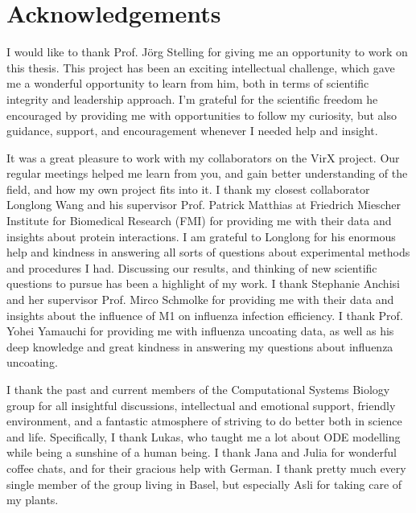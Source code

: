 
\bigskip

\begingroup
\let\clearpage\relax
\let\cleardoublepage\relax
\let\cleardoublepage\relax
\chapter*{Acknowledgements}

\def\thanks#1{%
\begingroup
\leftskip1em
\noindent #1
\par
\endgroup
}

I would like to thank Prof. J\"org Stelling for giving me an opportunity to work on this thesis. This project has been an exciting intellectual challenge, which gave me a wonderful opportunity to learn from him, both in terms of scientific integrity and leadership approach. I'm grateful for the scientific freedom he encouraged by providing me with opportunities to follow my curiosity, but also guidance, support, and encouragement whenever I needed help and insight.

It was a great pleasure to work with my collaborators on the VirX project. Our regular meetings helped me learn from you, and gain better understanding of the field, and how my own project fits into it. I thank my closest collaborator Longlong Wang and his supervisor Prof. Patrick Matthias at Friedrich Miescher Institute for Biomedical Research (FMI) for providing me with their data and insights about protein interactions. I am grateful to Longlong for his enormous help and kindness in answering all sorts of questions about experimental methods and procedures I had. Discussing our results, and thinking of new scientific questions to pursue has been a highlight of my work. I thank Stephanie Anchisi and her supervisor Prof. Mirco Schmolke for providing me with their data and insights about the influence of M1 on influenza infection efficiency. I thank Prof. Yohei Yamauchi for providing me with influenza uncoating data, as well as his deep knowledge and great kindness in answering my questions about influenza uncoating. 

I thank the past and current members of the Computational Systems Biology group for all insightful discussions, intellectual and emotional support, friendly environment, and a fantastic atmosphere of striving to do better both in science and life. Specifically, I thank Lukas, who taught me a lot about ODE modelling while being a sunshine of a human being. I thank Jana and Julia for wonderful coffee chats, and for their gracious help with German. I thank pretty much every single member of the group living in Basel, but especially Asli for taking care of my plants.

